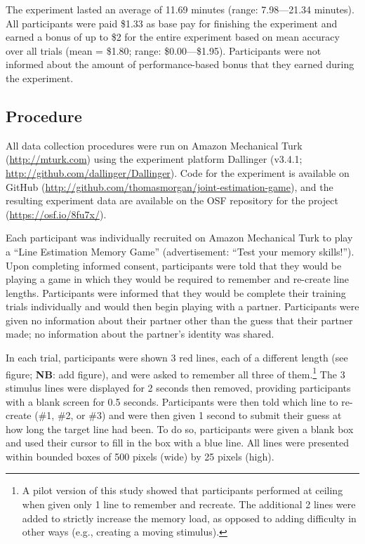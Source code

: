\documentclass[10pt, letterpaper]{article}
\begin{document}
The experiment lasted an average of 11.69 minutes (range: 7.98---21.34
minutes). All participants were paid \$1.33 as base pay for finishing
the experiment and earned a bonus of up to \$2 for the entire experiment
based on mean accuracy over all trials (mean = \$1.80; range:
\$0.00---\$1.95). Participants were not informed about the amount of
performance-based bonus that they earned during the experiment.

\subsection{Procedure}\label{procedure}

All data collection procedures were run on Amazon Mechanical Turk
(\url{http://mturk.com}) using the experiment platform Dallinger
(v3.4.1; \url{http://github.com/dallinger/Dallinger}). Code for the
experiment is available on GitHub
(\url{http://github.com/thomasmorgan/joint-estimation-game}), and the
resulting experiment data are available on the OSF repository for the
project (\url{https://osf.io/8fu7x/}).

Each participant was individually recruited on Amazon Mechanical Turk to
play a ``Line Estimation Memory Game'' (advertisement: ``Test your
memory skills!''). Upon completing informed consent, participants were
told that they would be playing a game in which they would be required
to remember and re-create line lengths. Participants were informed that
they would be complete their training trials individually and would then
begin playing with a partner. Participants were given no information
about their partner other than the guess that their partner made; no
information about the partner's identity was shared.

In each trial, participants were shown 3 red lines, each of a different
length (see figure; \textbf{NB}: add figure), and were asked to remember
all three of
them.\footnote{A pilot version of this study showed that participants performed at ceiling when given only 1 line to remember and recreate. The additional 2 lines were added to strictly increase the memory load, as opposed to adding difficulty in other ways (e.g., creating a moving stimulus).}
The 3 stimulus lines were displayed for 2 seconds then removed,
providing participants with a blank screen for 0.5 seconds. Participants
were then told which line to re-create (\#1, \#2, or \#3) and were then
given 1 second to submit their guess at how long the target line had
been. To do so, participants were given a blank box and used their
cursor to fill in the box with a blue line. All lines were presented
within bounded boxes of 500 pixels (wide) by 25 pixels (high).
\end{document}
